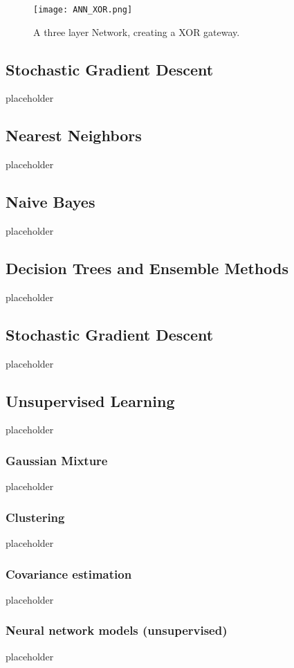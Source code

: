 		\begin{figure}[h]
			\centering
			\captionsetup{width=0.8\textwidth}
			\texttt{[image: ANN\_XOR.png]}
			\caption[ANN XOR Perceptron-Network]{
				\footnotesize{
					A three layer Network, creating a XOR gateway.
				}
			} 
			\label{ANN_XOR}
		\end{figure}
		
	
	 \cite{bishop1995neural}
	\subsection*{Stochastic Gradient Descent}
	{\color{red} placeholder}
	\subsection*{Nearest Neighbors}
	{\color{red} placeholder} \cite{bay1998combining}
	\subsection*{Naive Bayes}
	{\color{red} placeholder} \cite{rish2001empirical}
	\subsection*{Decision Trees and Ensemble Methods}
	{\color{red} placeholder}
	\cite{quinlan2014c4} \cite{breiman1984classification}
	\subsection*{Stochastic Gradient Descent}
	{\color{red} placeholder}
	
	\newpage
	\subsection{Unsupervised Learning}
	{\color{red} placeholder}
	\subsubsection*{Gaussian Mixture}
	{\color{red} placeholder}
	\subsubsection*{Clustering}
	{\color{red} placeholder}
	\subsubsection*{Covariance estimation}
	{\color{red} placeholder}
	\subsubsection*{Neural network models (unsupervised)}
	{\color{red} placeholder}
	
	
	
	
	
	
	
	
	
	
	
	
		
	
